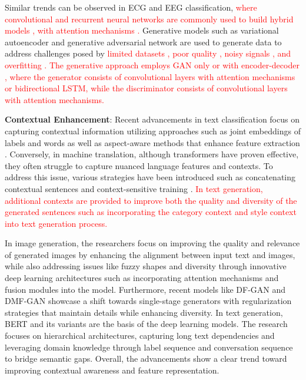 \documentclass[preprint,12pt]{elsarticle}
\begin{document}
Similar trends can be observed in ECG and EEG classification, \textcolor{red}{where convolutional and recurrent neural networks are commonly used to build hybrid models \citep{alamatsaz_lightweight_2024, hermawan_multi_2024}, with attention mechanisms \citep{sun_arrhythmia_2024, chen_automated_2022}.} Generative models such as variational autoencoder \citep{ dai2019eeg} and generative adversarial network are used to generate data to address challenges posed by \textcolor{red}{limited datasets \citep{yang_data_2024, msigwa_iot-driven_2024, song_eeggan-net_2024}, poor quality \citep{corley_deep_2025}, noisy signals \citep{cai_dhct-gan_2025}, and overfitting \citep{zhu_electrocardiogram_2019}. The generative approach employs GAN only or with encoder-decoder \citep{yang_data_2024}, where the generator consists of convolutional layers with attention mechanisms or bidirectional LSTM, while the discriminator consists of convolutional layers with attention mechanisms.}

\textbf{Contextual Enhancement}: Recent advancements in text classification focus on capturing contextual information utilizing approaches such as joint embeddings of labels \citep{wang_joint_2018} and words as well as aspect-aware methods that enhance feature extraction \citep{zhu_bert-based_2023}. Conversely, in machine translation, although transformers have proven effective, they often struggle to capture nuanced language features and contexts. To address this issue, various strategies have been introduced such as concatenating contextual sentences and context-sensitive training \citep{wu_study_2022, kim_towards_2023}. \textcolor{red}{In text generation, additional contexts are provided to improve both the quality and diversity of the generated sentences such as incorporating the category context \citep{li_feature-aware_2023} and style context \citep{kwon_class_2024} into text generation process.}

In image generation, the researchers focus on improving the quality and relevance of generated images by enhancing the alignment between input text and images, while also addressing issues like fuzzy shapes and diversity through innovative deep learning architectures such as incorporating attention mechanisms and fusion modules into the model. Furthermore, recent models like DF-GAN \citep{tao_df-gan_2022} and DMF-GAN \citep{yang_dmf-gan_2024} showcase a shift towards single-stage generators with regularization strategies that maintain details while enhancing diversity. In text generation, BERT and its variants are the basis of the deep learning models. The research focuses on hierarchical architectures, capturing long text dependencies \citep{ma_t-bertsum_2021} and leveraging domain knowledge through label sequence \citep{xie_pre-trained_2022} and conversation sequence \citep{li_incremental_2019} to bridge semantic gaps. Overall, the advancements show a clear trend toward improving contextual awareness and feature representation.
\end{document}
